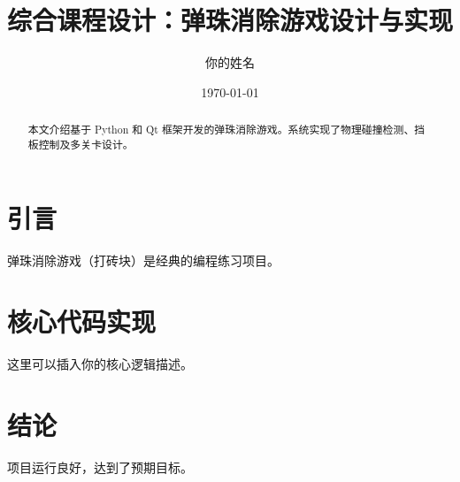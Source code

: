 \documentclass[UTF8]{ctexart} %
\title{综合课程设计：弹珠消除游戏设计与实现}
\author{你的姓名}
\date{\today}
\begin{document}
\maketitle

\begin{abstract}
本文介绍基于 Python 和 Qt 框架开发的弹珠消除游戏。系统实现了物理碰撞检测、挡板控制及多关卡设计。
\end{abstract}

\section{引言}
弹珠消除游戏（打砖块）是经典的编程练习项目。

\section{核心代码实现}
这里可以插入你的核心逻辑描述。

\section{结论}
项目运行良好，达到了预期目标。
\end{document}
